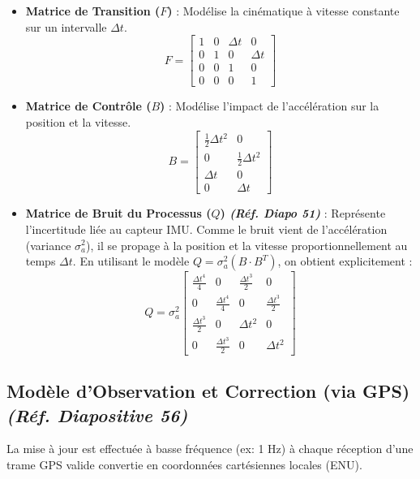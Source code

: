 \begin{itemize}
    \item \textbf{Matrice de Transition ($F$)} : Modélise la cinématique à vitesse constante sur un intervalle $\Delta t$.
    \begin{equation}
    F = \begin{bmatrix} 1 & 0 & \Delta t & 0 \\ 0 & 1 & 0 & \Delta t \\ 0 & 0 & 1 & 0 \\ 0 & 0 & 0 & 1 \end{bmatrix}
    \end{equation}
    
    \item \textbf{Matrice de Contrôle ($B$)} : Modélise l'impact de l'accélération sur la position et la vitesse.
    \begin{equation}
    B = \begin{bmatrix} \frac{1}{2}\Delta t^2 & 0 \\ 0 & \frac{1}{2}\Delta t^2 \\ \Delta t & 0 \\ 0 & \Delta t \end{bmatrix}
    \end{equation}
    
    \item \textbf{Matrice de Bruit du Processus ($Q$) \textit{(Réf. Diapo 51)}} : Représente l'incertitude liée au capteur IMU. Comme le bruit vient de l'accélération (variance $\sigma_a^2$), il se propage à la position et la vitesse proportionnellement au temps $\Delta t$. En utilisant le modèle $Q = \sigma_a^2 (B \cdot B^T)$, on obtient explicitement :
    \begin{equation}
    Q = \sigma_a^2 \begin{bmatrix} 
    \frac{\Delta t^4}{4} & 0 & \frac{\Delta t^3}{2} & 0 \\ 
    0 & \frac{\Delta t^4}{4} & 0 & \frac{\Delta t^3}{2} \\ 
    \frac{\Delta t^3}{2} & 0 & \Delta t^2 & 0 \\ 
    0 & \frac{\Delta t^3}{2} & 0 & \Delta t^2 
    \end{bmatrix}
    \end{equation}
\end{itemize}

\subsection{Modèle d'Observation et Correction (via GPS) \textit{(Réf. Diapositive 56)}}
La mise à jour est effectuée à basse fréquence (ex: 1 Hz) à chaque réception d'une trame GPS valide convertie en coordonnées cartésiennes locales (ENU).

